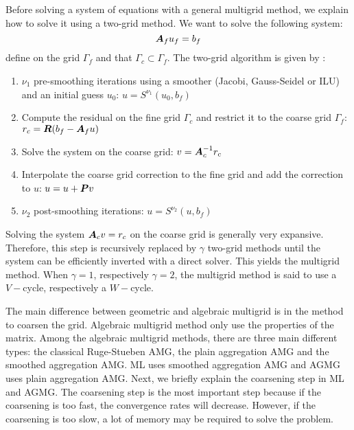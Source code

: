 Before solving a system of equations with a general multigrid method, we
explain how to solve it using a two-grid method. We want to
solve the following system:
\begin{equation}
  \boldsymbol{A}_f u_f = b_f
\end{equation}
define on the grid $\Gamma_f$ and that $\Gamma_c \subset \Gamma_f$. The 
two-grid algorithm is given by :
\begin{enumerate}
  \item $\nu_1$ pre-smoothing iterations using a smoother (Jacobi,
    Gauss-Seidel or ILU) and an initial guess $u_0$: $u = S^{\nu_1}(u_0,b_f)$
  \item Compute the residual on the fine grid $\Gamma_c$ and restrict it to
    the coarse grid $\Gamma_f$: $r_c = \boldsymbol{R}(b_f-\boldsymbol{A}_f u)$
  \item Solve the system on the coarse grid: $v=\boldsymbol{A}_c^{-1} r_c$
  \item Interpolate the coarse grid correction to the fine grid and add the
    correction to $u$: $u=u+\boldsymbol{P}v$
  \item $\nu_2$ post-smoothing iterations: $u = S^{\nu_2}(u,b_f)$
\end{enumerate}
Solving the system $\boldsymbol{A}_c v = r_c$ on the coarse grid is generally very
expansive. Therefore, this step is recursively replaced by $\gamma$ two-grid
methods until the system can be efficiently inverted with a direct solver.
This yields the multigrid method. When $\gamma = 1$, respectively $\gamma =
2$, the multigrid method is said to use a $V-$cycle, respectively a $W-$cycle.

The main difference between geometric and algebraic multigrid is in the method
to coarsen the grid. Algebraic multigrid method only use the properties of the
matrix. Among the algebraic multigrid methods, there are three main different 
types: the classical Ruge-Stueben AMG, the plain aggregation AMG and the
smoothed aggregation AMG. ML uses smoothed aggregation AMG and AGMG
uses plain aggregation AMG. Next, we briefly explain the coarsening step in
ML and AGMG. The coarsening step is the most important 
step because if the coarsening is too fast, the convergence rates will 
decrease. However, if the coarsening is too slow, a lot of memory may be 
required to solve the problem. 

